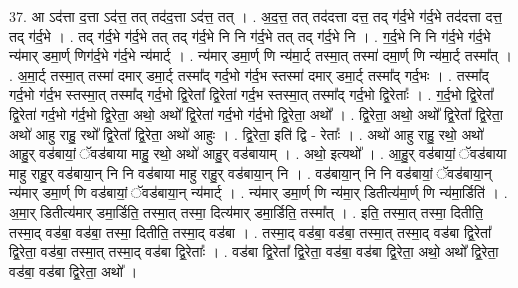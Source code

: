 \documentclass[17pt]{extarticle}
\begin{document}
37. आ ऽद॑त्ता द॒त्ता ऽद॑त्त॒ तत् तद॑द॒त्ता ऽद॑त्त॒ तत् । . अ॒द॒त्त॒ तत् तद॑दत्ता दत्त॒ तद् ग॑र्द॒भे ग॑र्द॒भे तद॑दत्ता दत्त॒ तद् ग॑र्द॒भे । . तद् ग॑र्द॒भे ग॑र्द॒भे तत् तद् ग॑र्द॒भे नि नि ग॑र्द॒भे तत् तद् ग॑र्द॒भे नि । . ग॒र्द॒भे नि नि ग॑र्द॒भे ग॑र्द॒भे न्य॑मार् डमा॒र्ण् णिग॑र्द॒भे ग॑र्द॒भे न्य॑मार्ट् । . न्य॑मार् डमा॒र्ण् णि न्य॑मा॒र्ट् तस्मा॒त् तस्मा॑ दमा॒र्ण् णि न्य॑मा॒र्ट् तस्मा᳚त् । . अ॒मा॒र्ट् तस्मा॒त् तस्मा॑ दमार् डमा॒र्ट् तस्मा᳚द् गर्द॒भो ग॑र्द॒भ स्तस्मा॑ दमार् डमा॒र्ट् तस्मा᳚द् गर्द॒भः । . तस्मा᳚द् गर्द॒भो ग॑र्द॒भ स्तस्मा॒त् तस्मा᳚द् गर्द॒भो द्वि॒रेता᳚ द्वि॒रेता॑ गर्द॒भ स्तस्मा॒त् तस्मा᳚द् गर्द॒भो द्वि॒रेताः᳚ । . ग॒र्द॒भो द्वि॒रेता᳚ द्वि॒रेता॑ गर्द॒भो ग॑र्द॒भो द्वि॒रेता॒ अथो॒ अथो᳚ द्वि॒रेता॑ गर्द॒भो ग॑र्द॒भो द्वि॒रेता॒ अथो᳚ । . द्वि॒रेता॒ अथो॒ अथो᳚ द्वि॒रेता᳚ द्वि॒रेता॒ अथो॑ आहु राहु॒ रथो᳚ द्वि॒रेता᳚ द्वि॒रेता॒ अथो॑ आहुः । . द्वि॒रेता॒ इति॑ द्वि - रेताः᳚ । . अथो॑ आहु राहु॒ रथो॒ अथो॑ आहु॒र् वड॑बायां॒ ॅवड॑बाया माहु॒ रथो॒ अथो॑ आहु॒र् वड॑बायाम् । . अथो॒ इत्यथो᳚ । . आ॒हु॒र् वड॑बायां॒ ॅवड॑बाया माहु राहु॒र् वड॑बाया॒न् नि नि वड॑बाया माहु राहु॒र् वड॑बाया॒न् नि । . वड॑बाया॒न् नि नि वड॑बायां॒ ॅवड॑बाया॒न् न्य॑मार् डमा॒र्ण् णि वड॑बायां॒ ॅवड॑बाया॒न् न्य॑मार्ट् । . न्य॑मार् डमा॒र्ण् णि न्य॑मा॒र् डितीत्य॑मा॒र्ण् णि न्य॑मा॒र्डिति॑ । . अ॒मा॒र् डितीत्य॑मार् डमा॒र्डिति॒ तस्मा॒त् तस्मा॒ दित्य॑मार् डमा॒र्डिति॒ तस्मा᳚त् । . इति॒ तस्मा॒त् तस्मा॒ दितीति॒ तस्मा॒द् वड॑बा॒ वड॑बा॒ तस्मा॒ दितीति॒ तस्मा॒द् वड॑बा । . तस्मा॒द् वड॑बा॒ वड॑बा॒ तस्मा॒त् तस्मा॒द् वड॑बा द्वि॒रेता᳚ द्वि॒रेता॒ वड॑बा॒ तस्मा॒त् तस्मा॒द् वड॑बा द्वि॒रेताः᳚ । . वड॑बा द्वि॒रेता᳚ द्वि॒रेता॒ वड॑बा॒ वड॑बा द्वि॒रेता॒ अथो॒ अथो᳚ द्वि॒रेता॒ वड॑बा॒ वड॑बा द्वि॒रेता॒ अथो᳚ । \newline
\end{document}
